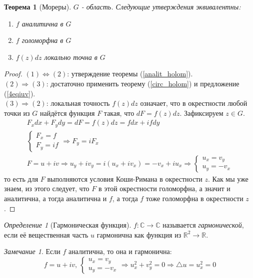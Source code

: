 \documentclass[12pt]{article}
\newcommand{\R}{\mathbb{R}}
\renewcommand{\C}{\mathbb{C}}
\newcommand{\Ra}{\Rightarrow}
\renewcommand{\iff}{\Leftrightarrow}
\newcounter{cnt}
\theoremstyle{thmnote}
\newtheorem{theorem}[cnt]{Теорема}
\theoremstyle{remark}
\newtheorem*{remark}{Замечание}
\theoremstyle{defnote}
\newtheorem{definition}[cnt]{Определение}
\begin{document}
\begin{theorem}[Мореры]
\label{Morera}
    $G$ - область. Следующие утверждения эквивалентны:
    \begin{enumerate}
        \item $f$ аналитична в $G$
        \item $f$ голоморфна в $G$
        \item $f(z)dz$ локально точна в $G$
    \end{enumerate}
\end{theorem}
\begin{proof}
    $(1) \iff (2)$: утверждение теоремы (\ref{analit_holom}).\\
    $(2) \Ra (3)$: достаточно применить теорему (\ref{circ_holom}) и предложение (\ref{4eqiuv}).\\
    $(3) \Ra (2)$: локальная точность $f(z)dz$ означает, что в окрестности любой точки из $G$ найдётся функция $F$ такая, что $dF = f(z)dz$. Зафиксируем $z \in G$.
    \begin{gather*}
        F_x dx + F_y dy = dF = f(z)dz = f dx + i f dy \\
        \begin{cases}
            F_x = f \\
            F_y = if
        \end{cases} \Ra F_y = i F_x \\
        F = u + iv \Ra u_y + iv_y = i(u_x + iv_x) = -v_x + iu_x \Ra \begin{cases}
            u_x = v_y \\
            u_y = - v_x
        \end{cases}
    \end{gather*}
    то есть для $F$ выполняются условия Коши-Римана в окрестности $z$. Как мы уже знаем, из этого следует, что $F$ в этой окрестности голоморфна, а значит и аналитична, а тогда аналитична и $f$, а тогда $f$ тоже голоморфна в окрестности $z$.
\end{proof}

\begin{definition}[Гармоническая функция]
    $f: \C \to \C$ называется \textit{гармонической}, если её вещественная часть $u$ гармонична как функция из $\R^2 \to \R$.
\end{definition}

\begin{remark}
    Если $f$ аналитична, то она и гармонична:
    \begin{equation*}
        f = u + iv,\,
        \begin{cases}
            u_x = v_y \\
            u_y = - v_x
        \end{cases} \Ra u_x^2 + v_y^2 = 0 \Ra \triangle u = u_x^2 = 0
    \end{equation*}
\end{remark}
\end{document}

